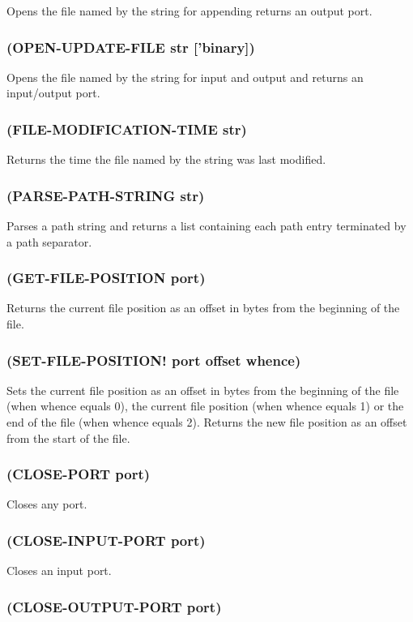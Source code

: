 \documentclass[11pt]{article}
\begin{document}
Opens the file named by the string for appending returns an output
port.
\subsubsection{(OPEN-UPDATE-FILE str ['binary])}
\label{sec-4-37-4}

Opens the file named by the string for input and output and returns
an input/output port.
\subsubsection{(FILE-MODIFICATION-TIME str)}
\label{sec-4-37-5}

Returns the time the file named by the string was last modified.
\subsubsection{(PARSE-PATH-STRING str)}
\label{sec-4-37-6}

Parses a path string and returns a list containing each path entry
terminated by a path separator.
\subsubsection{(GET-FILE-POSITION port)}
\label{sec-4-37-7}

Returns the current file position as an offset in bytes from the
beginning of the file.
\subsubsection{(SET-FILE-POSITION! port offset whence)}
\label{sec-4-37-8}

Sets the current file position as an offset in bytes from the
beginning of the file (when whence equals 0), the current file
position (when whence equals 1) or the end of the file (when whence
equals 2).  Returns the new file position as an offset from the start
of the file.
\subsubsection{(CLOSE-PORT port)}
\label{sec-4-37-9}

Closes any port.
\subsubsection{(CLOSE-INPUT-PORT port)}
\label{sec-4-37-10}

Closes an input port.
\subsubsection{(CLOSE-OUTPUT-PORT port)}
\label{sec-4-37-11}
\end{document}
